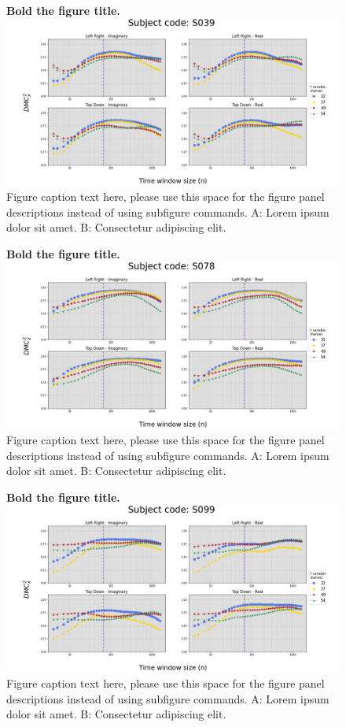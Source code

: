 \documentclass[10pt,letterpaper]{article}
\begin{document}
\begin{figure}[!h]
    \caption{{\bf Bold the figure title.}
    \includegraphics[width=.9\textwidth]{../output/figs/stats/S039.jpg}
    Figure caption text here, please use this space for the figure panel descriptions instead of using subfigure commands. A: Lorem ipsum dolor sit amet. B: Consectetur adipiscing elit.}
    \label{fig39}
\end{figure}

\begin{figure}[!h]
    \caption{{\bf Bold the figure title.}
    \includegraphics[width=.9\textwidth]{../output/figs/stats/S078.jpg}
      Figure caption text here, please use this space for the figure panel descriptions instead of using subfigure commands. A: Lorem ipsum dolor sit amet. B: Consectetur adipiscing elit.}
    \label{fig78}
\end{figure}

\begin{figure}[!h]
    \caption{{\bf Bold the figure title.}
    \includegraphics[width=.9\textwidth]{../output/figs/stats/S099.jpg}
      Figure caption text here, please use this space for the figure panel descriptions instead of using subfigure commands. A: Lorem ipsum dolor sit amet. B: Consectetur adipiscing elit.}
    \label{fig99}
\end{figure}
\end{document}
